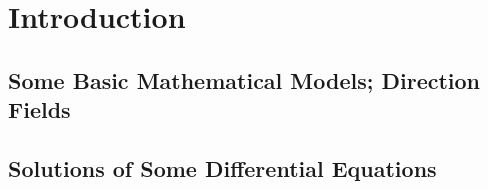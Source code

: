 \chapter{Introduction}
\section{Some Basic Mathematical Models; Direction Fields}
\pagebreak
\section{Solutions of Some Differential Equations}

